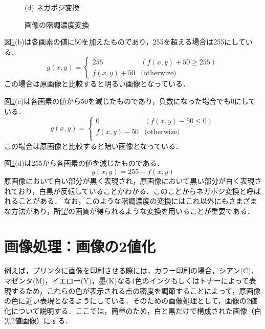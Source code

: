 \begin{figure}[H]
\begin{center}
\begin{minipage}{6cm}
\begin{center}
(d) ネガポジ変換
\end{center}
\end{minipage}
\end{center}
\caption{画像の階調濃度変換}
\label{fig:008-05}
\end{figure}

図\ref{fig:008-05}(b)は各画素の値に50を加えたものであり，255を超える場合は255にしている．
\begin{equation}
g(x,y)=
\left \{
\begin{array}{cc}
255 & (f(x,y)+50\geq 255) \\
f(x,y)+50 & \textrm{(otherwize)}
\end{array}
\right .
\end{equation}
この場合は原画像と比較すると明るい画像となっている．

図\ref{fig:008-05}(c)は各画素の値から50を減じたものであり，負数になった場合でも0にしている．
\begin{equation}
g(x,y)=
\left \{
\begin{array}{cc}
0 & (f(x,y)-50\leq 0) \\
f(x,y)-50 & \textrm{(otherwize)} \\
\end{array}
\right .
\end{equation}
この場合は原画像と比較すると暗い画像となっている．

図\ref{fig:008-05}(d)は255から各画素の値を減じたものである．
\begin{equation}
g(x,y)=255-f(x,y)
\end{equation}
原画像において白い部分が黒く表現され，原画像において黒い部分が白く表現されており，白黒が反転していることがわかる．このことからネガポジ変換と呼ばれることがある．
なお，このような階調濃度の変換にはこれ以外にもさまざまな方法があり，所望の画質が得られるような変換を用いることが重要である．

\section{画像処理：画像の2値化}


例えば，プリンタに画像を印刷させる際には，カラー印刷の場合，シアン(C)，マゼンタ(M)，イエロー(Y)，墨(K)なる4色のインクもしくはトナーによって表現するため，これらの色が表示される点の密度を調節することによって，原画像の色に近い表現となるようにしている．そのための画像処理として，画像の2値化について説明する．ここでは，簡単のため，白と黒だけで構成された画像（白黒2値画像）にする．

